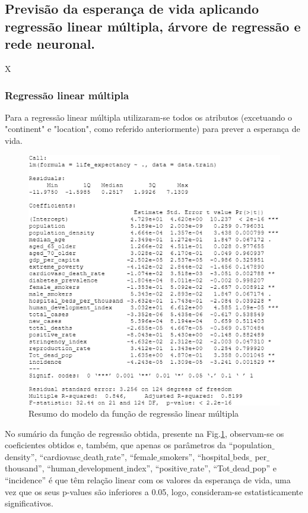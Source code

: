 \documentclass[conference]{IEEEtran}
\begin{document}
\subsection{Previsão da esperança de vida aplicando regressão linear múltipla, árvore de regressão e rede neuronal.}
X

\subsubsection{Regressão linear múltipla}
Para a regressão linear múltipla utilizaram-se todos os atributos (excetuando o "continent" e "location", como referido anteriormente) para prever a esperança de vida.

\begin{figure}[htbp]
\centerline{\includegraphics[width=0.95\columnwidth]{images/04_1.png}}
\caption{Resumo do modelo da função de regressão linear múltipla}
\label{4a}
\end{figure}

No sumário da função de regressão obtida, presente na Fig.\ref{4a}, observam-se os coeficientes obtidos e, também, que apenas os parâmetros da “population$\_$density”, “cardiovasc$\_$death$\_$rate”, “female$\_$smokers”, “hospital$\_$beds$\_$ per$\_$thousand”, “human$\_$development$\_$index”, “positive$\_$rate”, “Tot$\_$dead$\_$pop” e “incidence” é que têm relação linear com os valores da esperança de vida, uma vez que os seus p-values são inferiores a 0.05, logo, consideram-se estatisticamente significativos.
\end{document}
